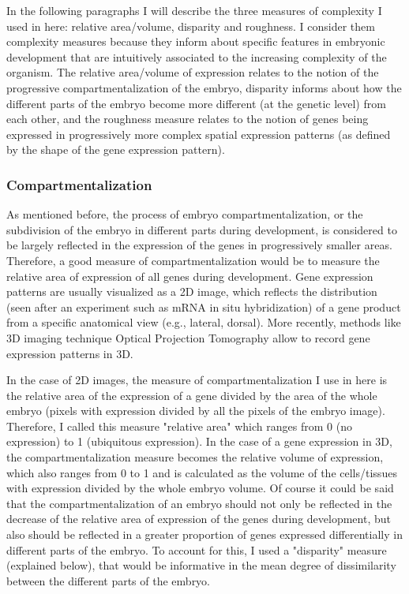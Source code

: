 
In the following paragraphs I will describe the three measures of complexity I used in here: relative area/volume, disparity and roughness. I consider them complexity measures because they inform about specific features in embryonic development that are intuitively associated to the increasing complexity of the organism. The relative area/volume of expression relates to the notion of the progressive compartmentalization of the embryo, disparity informs about how the different parts of the embryo become more different (at the genetic level) from each other, and the roughness measure relates to the notion of genes being expressed in progressively more complex spatial expression patterns (as defined by the shape of the gene expression pattern).


\subsubsection{Compartmentalization}

As mentioned before, the process of embryo compartmentalization, or the subdivision of the embryo in different parts during development, is considered to be largely reflected in the expression of the genes in progressively smaller areas. Therefore, a good measure of compartmentalization would be to measure the relative area of expression of all genes during development. Gene expression patterns are usually visualized as a 2D image, which reflects the distribution (seen after an experiment such as mRNA in situ hybridization) of a gene product from a specific anatomical view (e.g., lateral, dorsal).  More recently, methods like 3D imaging technique Optical Projection Tomography  \citep{Sharpe2003,Summerhurst2008} allow to record gene expression patterns in 3D. 

In the case of 2D images, the measure of compartmentalization I use in here is the relative area of the expression of a gene divided by the area of the whole embryo (pixels with expression divided by all the pixels of the embryo image). Therefore, I called this measure "relative area" which ranges from 0 (no expression) to 1 (ubiquitous expression). In the case of a gene expression in 3D, the compartmentalization measure becomes the relative volume of expression, which also ranges from 0 to 1 and is calculated as the volume of the cells/tissues with expression divided by the whole embryo volume.
Of course it could be said that the compartmentalization of an embryo should not only be reflected in the decrease of the relative area of expression of the genes during development, but also should be reflected in a greater proportion of genes expressed differentially in different parts of the embryo. To account for this, I used a "disparity" measure (explained below), that would be informative in the mean degree of dissimilarity between the different parts of the embryo.

